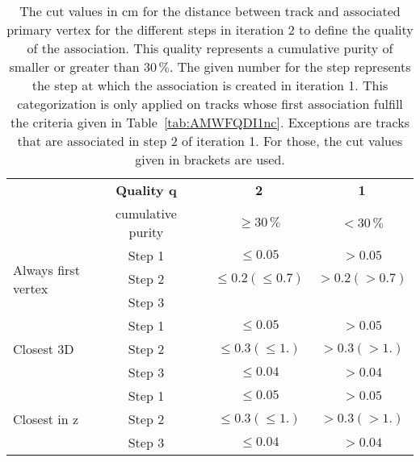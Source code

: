 
\begin{table}[h]
\begin{center}
\caption[Cut values for the distance between track and vertex to define the qualities of the association created in iteration 2]{The cut values in cm for the distance between track and associated primary vertex for the different steps in iteration 2 to define the quality of the association. This quality represents a  cumulative purity of smaller or greater than $30\,\%$. The given number for the step represents the step at which the association is created in iteration 1. This categorization is only applied on tracks whose first association fulfill the criteria given in Table~\ref{tab:AMWFQDI1nc}. Exceptions are tracks that are associated in step 2 of iteration 1. For those, the cut values given in brackets are used.}
\label{tab:AMWFQDI2}

\begin{tabular}{l c c c c}
 	& \textbf{Quality q} & & \textbf{2} & \textbf{1}  \\
 	& cumulative purity & & $\geq30\,\%$ & $<30\,\%$    \\
\midrule[2pt]
\multirow{3}{*}{Always first vertex} 
	& Step 1 & & $\leq0.05$ & $>0.05$ \\
\cmidrule{2-5} 
	 & Step 2 & & $\leq0.2 \left(\leq0.7\right)$ & $>0.2\left(>0.7\right)$ \\
\cmidrule{2-5} 
	& Step 3 & &  &  \\
\midrule[2pt]
\multirow{3}{*}{Closest 3D} 
	& Step 1 & & $\leq0.05$ & $>0.05$ \\
\cmidrule{2-5} 
	 &  Step 2 & & $\leq0.3 \left(\leq1.\right)$ & $>0.3\left(>1.\right)$ \\
\cmidrule{2-5} 
	& Step 3 & & $\leq0.04$ & $>0.04$ \\
\midrule[2pt]
\multirow{3}{*}{Closest in z} 
	& Step 1 & & $\leq0.05$ & $>0.05$ \\
\cmidrule{2-5} 
	 &  Step 2 & & $\leq0.3 \left(\leq1.\right)$ & $>0.3\left(>1.\right)$ \\
\cmidrule{2-5} 
	& Step 3 & & $\leq0.04$ & $>0.04$ \\
\end{tabular}

\end{center}
\end{table}